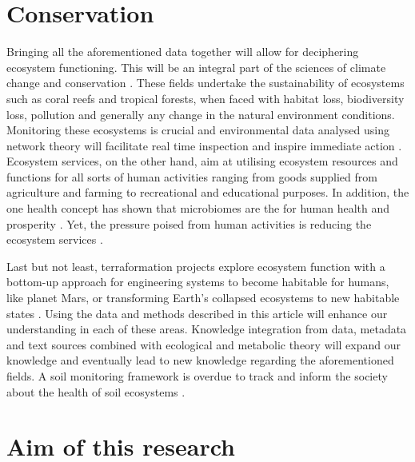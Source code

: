 \section{Conservation}
\label{sec:conservation}

Bringing all the aforementioned data together will allow for deciphering ecosystem functioning.
This will be an integral part of the sciences of climate change
and conservation \parencite{cavicchioli2019scientists}. These fields undertake the
sustainability of ecosystems such as coral reefs and tropical forests, when
faced with habitat loss, biodiversity loss, pollution and generally any change
in the natural environment conditions. Monitoring these ecosystems is crucial
and environmental data analysed using network theory will facilitate real time
inspection and inspire immediate action \parencite{derocles2018Biomonitoring}.
Ecosystem services, on the other hand, aim at utilising ecosystem resources
and functions for all sorts of human activities ranging from goods supplied
from agriculture and farming \parencite{alvarez-silva2017Compartmentalized} to
recreational and educational purposes. In addition, the one health concept has
shown that microbiomes are the for human health and prosperity
\parencite{banerjee2023Soil, lehmann2020concept}. Yet, the pressure poised from human activities
is reducing the ecosystem services \parencite{rillig2023Increasing}.

Last but not least, terraformation
projects explore ecosystem function with a bottom-up approach for engineering
systems to become habitable for humans, like planet Mars, or transforming
Earth's collapsed ecosystems to new habitable states
\parencite{conde-pueyo2020Synthetic}. Using the data and methods described in this
article will enhance our understanding in each of these areas. Knowledge
integration from data, metadata and text sources combined with ecological and
metabolic theory will expand our knowledge and eventually lead to new
knowledge regarding the aforementioned fields. A soil monitoring framework 
is overdue to track and inform the society about the health of 
soil ecosystems \parencite{guerra2021tracking}.

\section{Aim of this research}
\label{sec:aim}

